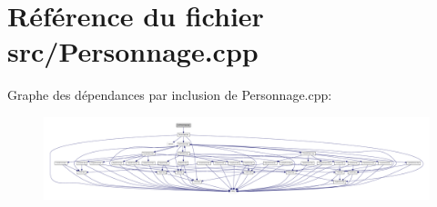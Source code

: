 \section{Référence du fichier src/\-Personnage.cpp}
\label{_personnage_8cpp}
Graphe des dépendances par inclusion de Personnage.\-cpp\-:\nopagebreak
\begin{figure}[H]
\begin{center}
\leavevmode
\includegraphics[width=350pt]{_personnage_8cpp__incl}
\end{center}
\end{figure}
